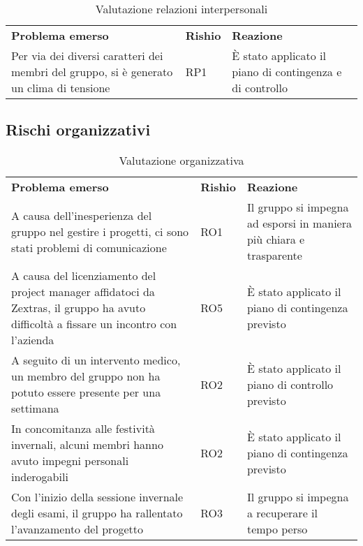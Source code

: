     \begin{table}[h]
        \begin{adjustbox}{width=\textwidth}
            \centering
            \renewcommand{\arraystretch}{1.1}
            \begin{tabular}{>{\centering\arraybackslash} m{5cm} >{\centering\arraybackslash} m{1.5cm} >{\centering\arraybackslash} m{4cm}}
                \rowcolor[HTML]{bfbfbf} 
                \textbf{Problema emerso} & \textbf{Rishio} & \textbf{Reazione} \\
                Per via dei diversi caratteri dei membri del gruppo, si è generato un clima di tensione & RP1 &  È stato applicato il piano di contingenza e di controllo \\
            \end{tabular}
        \end{adjustbox}
        \caption{Valutazione relazioni interpersonali}
    \end{table}
    \clearpage

\subsection{Rischi organizzativi}
    \begin{table}[h]
        \begin{adjustbox}{width=\textwidth}
            \centering
            \renewcommand{\arraystretch}{1.1}
            \begin{tabular}{>{\centering\arraybackslash} m{5cm} >{\centering\arraybackslash} m{1.5cm} >{\centering\arraybackslash} m{4cm}}
                \rowcolor[HTML]{bfbfbf} 
                \textbf{Problema emerso} & \textbf{Rishio} & \textbf{Reazione} \\
                A causa dell'inesperienza del gruppo nel gestire i progetti, ci sono stati problemi di comunicazione & RO1 & Il gruppo si impegna ad esporsi in maniera più chiara e trasparente \\
                A causa del licenziamento del project manager affidatoci da Zextras, il gruppo ha avuto difficoltà a fissare un incontro con l'azienda & RO5 & È stato applicato il piano di contingenza previsto \\
                A seguito di un intervento medico, un membro del gruppo non ha potuto essere presente per una settimana & RO2 & È stato applicato il piano di controllo previsto\\
                In concomitanza alle festività invernali, alcuni membri hanno avuto impegni personali inderogabili & RO2 & È stato applicato il piano di contingenza previsto \\
                Con l'inizio della sessione invernale degli esami, il gruppo ha rallentato l'avanzamento del progetto & RO3 & Il gruppo si impegna a recuperare il tempo perso
            \end{tabular}
        \end{adjustbox}
        \caption{Valutazione organizzativa}
    \end{table}

